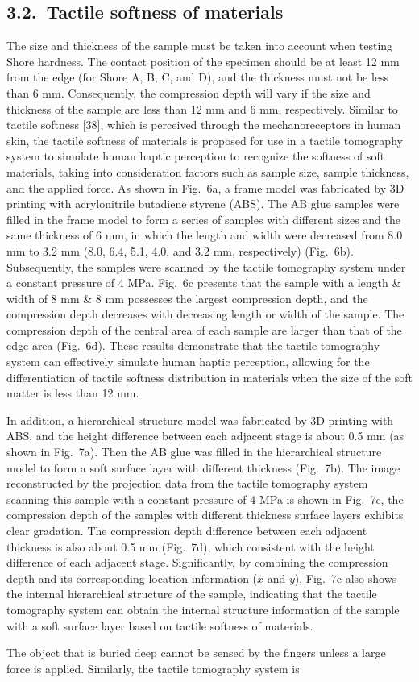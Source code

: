 \documentclass[11pt]{article}
\begin{document}
\subsection*{3.2.\ Tactile softness of materials}

The size and thickness of the sample must be taken into account when
testing Shore hardness. The contact position of the specimen should
be at least 12 mm from the edge (for Shore A, B, C, and D), and the
thickness must not be less than 6 mm. Consequently, the compression
depth will vary if the size and thickness of the sample are less
than 12 mm and 6 mm, respectively. Similar to tactile softness [38],
which is perceived through the mechanoreceptors in human skin, the
tactile softness of materials is proposed for use in a tactile
tomography system to simulate human haptic perception to recognize
the softness of soft materials, taking into consideration factors
such as sample size, sample thickness, and the applied force. As
shown in Fig.~6a, a frame model was fabricated by 3D printing with
acrylonitrile butadiene styrene (ABS). The AB glue samples were
filled in the frame model to form a series of samples with different
sizes and the same thickness of 6 mm, in which the length and width
were decreased from 8.0 mm to 3.2 mm (8.0, 6.4, 5.1, 4.0, and 3.2
mm, respectively) (Fig.~6b). Subsequently, the samples were scanned
by the tactile tomography system under a constant pressure of 4 MPa.
Fig.~6c presents that the sample with a length \& width of 8 mm \&
8 mm possesses the largest compression depth, and the compression
depth decreases with decreasing length or width of the sample. The
compression depth of the central area of each sample are larger than
that of the edge area (Fig.~6d). These results demonstrate that the
tactile tomography system can effectively simulate human haptic
perception, allowing for the differentiation of tactile softness
distribution in materials when the size of the soft matter is less
than 12 mm.

In addition, a hierarchical structure model was fabricated by 3D
printing with ABS, and the height difference between each adjacent
stage is about 0.5 mm (as shown in Fig.~7a). Then the AB glue was
filled in the hierarchical structure model to form a soft surface
layer with different thickness (Fig.~7b). The image reconstructed by
the projection data from the tactile tomography system scanning this
sample with a constant pressure of 4 MPa is shown in Fig.~7c, the
compression depth of the samples with different thickness surface
layers exhibits clear gradation. The compression depth difference
between each adjacent thickness is also about 0.5 mm (Fig.~7d),
which consistent with the height difference of each adjacent stage.
Significantly, by combining the compression depth and its
corresponding location information ($x$ and $y$), Fig.~7c also
shows the internal hierarchical structure of the sample, indicating
that the tactile tomography system can obtain the internal structure
information of the sample with a soft surface layer based on tactile
softness of materials.

The object that is buried deep cannot be sensed by the fingers
unless a large force is applied. Similarly, the tactile tomography
system is
\end{document}
